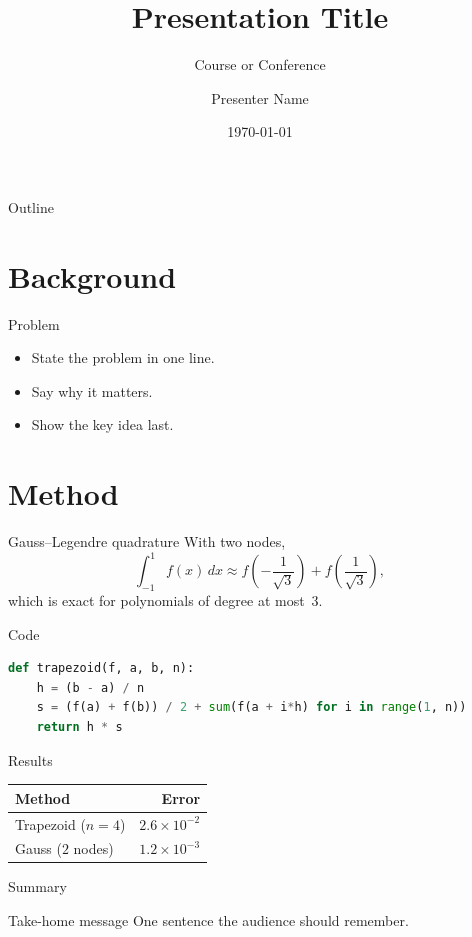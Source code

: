 \documentclass[aspectratio=169]{beamer}
\title{Presentation Title}%
\subtitle{Course or Conference}%
\author{Presenter Name}%
\institute{Department, University}%
\date{\today}
\begin{document}
\begin{frame}
  \titlepage
\end{frame}

\begin{frame}{Outline}
  \tableofcontents
\end{frame}

\section{Background}

\begin{frame}{Problem}
  \begin{itemize}
    \item State the problem in one line.
    \item Say why it matters.
    \pause
    \item Show the key idea last.
  \end{itemize}
\end{frame}

\section{Method}

\begin{frame}{Gauss--Legendre quadrature}
  With two nodes,
  \begin{equation}
    \int_{-1}^{1} f(x)\,dx \approx f\!\left(-\frac{1}{\sqrt{3}}\right)
                                 + f\!\left(\frac{1}{\sqrt{3}}\right),
    \label{eq:gauss}
  \end{equation}
  which is exact for polynomials of degree at most~3.
\end{frame}

\begin{frame}[fragile]{Code}
  \begin{lstlisting}[language=Python]
def trapezoid(f, a, b, n):
    h = (b - a) / n
    s = (f(a) + f(b)) / 2 + sum(f(a + i*h) for i in range(1, n))
    return h * s
  \end{lstlisting}
\end{frame}

\begin{frame}{Results}
  \centering
  \begin{tabular}{@{}lr@{}}
    \toprule
    Method & Error \\
    \midrule
    Trapezoid ($n = 4$) & $2.6 \times 10^{-2}$ \\
    Gauss ($2$ nodes)   & $1.2 \times 10^{-3}$ \\
    \bottomrule
  \end{tabular}
\end{frame}

\begin{frame}{Summary}
  \begin{block}{Take-home message}
    One sentence the audience should remember.
  \end{block}
\end{frame}
\end{document}
